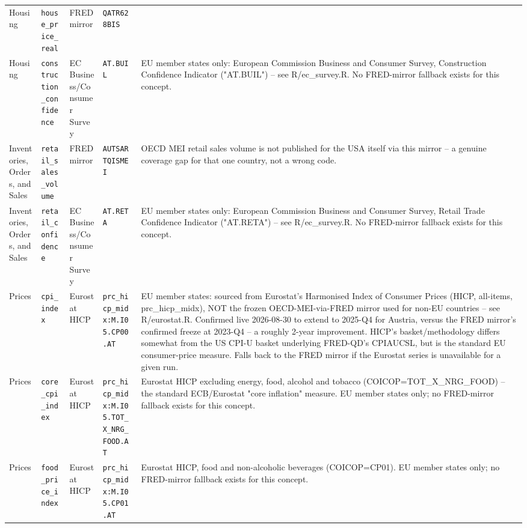 \documentclass[11pt]{article}
\begin{document}
\begin{landscape}
\begin{longtable}{L{3cm} L{4cm} L{2.6cm} L{3.2cm} L{7.5cm}}
Housing & \texttt{house\_\allowbreak{}price\_\allowbreak{}real} & FRED mirror & \texttt{QATR628BIS} &  \\
Housing & \texttt{construction\_\allowbreak{}confidence} & EC Business/Consumer Survey & \texttt{AT.\allowbreak{}BUIL} & EU member states only: European Commission Business and Consumer Survey, Construction Confidence Indicator ("AT.BUIL") -- see R/ec\_survey.R. No FRED-mirror fallback exists for this concept. \\
Inventories, Orders, and Sales & \texttt{retail\_\allowbreak{}sales\_\allowbreak{}volume} & FRED mirror & \texttt{AUTSARTQISMEI} & OECD MEI retail sales volume is not published for the USA itself via this mirror -- a genuine coverage gap for that one country, not a wrong code. \\
Inventories, Orders, and Sales & \texttt{retail\_\allowbreak{}confidence} & EC Business/Consumer Survey & \texttt{AT.\allowbreak{}RETA} & EU member states only: European Commission Business and Consumer Survey, Retail Trade Confidence Indicator ("AT.RETA") -- see R/ec\_survey.R. No FRED-mirror fallback exists for this concept. \\
Prices & \texttt{cpi\_\allowbreak{}index} & Eurostat HICP & \texttt{prc\_\allowbreak{}hicp\_\allowbreak{}midx:\allowbreak{}M.\allowbreak{}I05.\allowbreak{}CP00.\allowbreak{}AT} & EU member states: sourced from Eurostat's Harmonised Index of Consumer Prices (HICP, all-items, prc\_hicp\_midx), NOT the frozen OECD-MEI-via-FRED mirror used for non-EU countries -- see R/eurostat.R. Confirmed live 2026-08-30 to extend to 2025-Q4 for Austria, versus the FRED mirror's confirmed freeze at 2023-Q4 -- a roughly 2-year improvement. HICP's basket/methodology differs somewhat from the US CPI-U basket underlying FRED-QD's CPIAUCSL, but is the standard EU consumer-price measure. Falls back to the FRED mirror if the Eurostat series is unavailable for a given run. \\
Prices & \texttt{core\_\allowbreak{}cpi\_\allowbreak{}index} & Eurostat HICP & \texttt{prc\_\allowbreak{}hicp\_\allowbreak{}midx:\allowbreak{}M.\allowbreak{}I05.\allowbreak{}TOT\_\allowbreak{}X\_\allowbreak{}NRG\_\allowbreak{}FOOD.\allowbreak{}AT} & Eurostat HICP excluding energy, food, alcohol and tobacco (COICOP=TOT\_X\_NRG\_FOOD) -- the standard ECB/Eurostat "core inflation" measure. EU member states only; no FRED-mirror fallback exists for this concept. \\
Prices & \texttt{food\_\allowbreak{}price\_\allowbreak{}index} & Eurostat HICP & \texttt{prc\_\allowbreak{}hicp\_\allowbreak{}midx:\allowbreak{}M.\allowbreak{}I05.\allowbreak{}CP01.\allowbreak{}AT} & Eurostat HICP, food and non-alcoholic beverages (COICOP=CP01). EU member states only; no FRED-mirror fallback exists for this concept. \\

\end{longtable}
\end{landscape}
\end{document}
